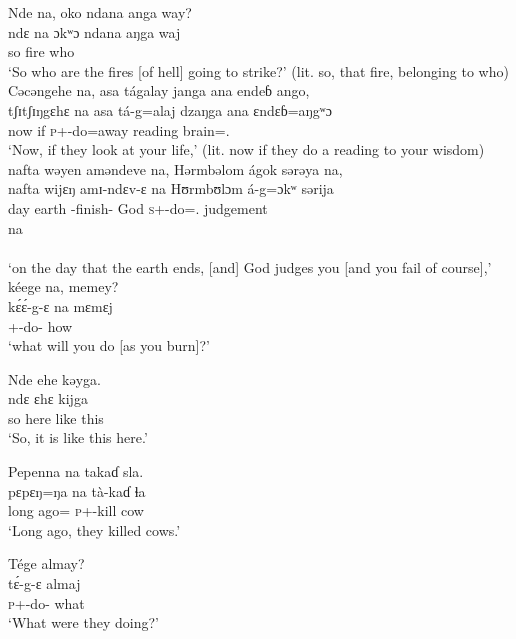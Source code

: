 \ea Nde  na,  oko  ndana  anga  way?\\
 \gll ndɛ  na   ɔkʷɔ   ndana   aŋga   waj\\
 so  {\PSP}  fire  {\DEM}  {\POSS}  who\\
 \glt ‘So who are the fires [of hell] going to strike?’ (lit. so, that fire, belonging to who)
 \z
\clearpage
\ea Cəcəngehe  na,  asa  tágalay  janga  ana  endeɓ  ango,      \\
 \gll tʃɪtʃɪŋgɛhɛ    na  asa  tá-g=alaj      dzaŋga   ana    ɛndɛɓ=aŋgʷɔ\\
 now            {\PSP}    if     \textsc{p}+{\IFV}-do=away  reading  {\DAT}   brain={\twoS}.{\POSS}  \\
 \glt ‘Now, if they look at your life,’ (lit. now if they do a reading to your wisdom)\\
 
 \medskip
   nafta  wəyen  aməndeve  na,  Hərmbəlom  ágok  sərəya  na,\\
 \gll nafta   wijɛŋ  amɪ-ndɛv-ɛ  na  Hʊrmbʊlɔm  á-g=ɔkʷ sərija  \\ 
 day     earth    {\DEP}-finish-{\CL}   {\PSP}    God           \textsc{s}+{\IFV}-do={\twoS}.{\IO}   judgement  \\  
   
 \medskip
 \gll na\\
      {\PSP} \\
 \glt ‘on the day that the earth ends, [and] God judges you [and you fail of course],’\\

 \medskip
  kéege  na,  memey?\\
 \gll k\'ɛ\'ɛ-g-ɛ    na  mɛmɛj\\
 {\twoS}+{\POT}-do-{\CL}  {\PSP}  how\\
 \glt ‘what will you do [as you burn]?’
 \z


\ea Nde  ehe  kəyga.\\
 \gll ndɛ  ɛhɛ   kijga\\
 so  here  {like this}\\
 \glt ‘So, it is like this here.’ 
 \z

\ea Pepenna  na  takaɗ  sla.\\
 \gll pɛpɛŋ=ŋa   na  tà-kaɗ ɬa \\
{long ago}={\ADV}  {\PSP}  \textsc{p}+{\PFV}-kill  cow  \\
 \glt ‘Long ago, they killed cows.’
 \z

\ea Tége  almay?\\
 \gll t\'ɛ-g-ɛ     almaj\\
 \textsc{p}+{\IFV}{}-do-{\CL}  what\\
 \glt ‘What were they doing?’
 \z

